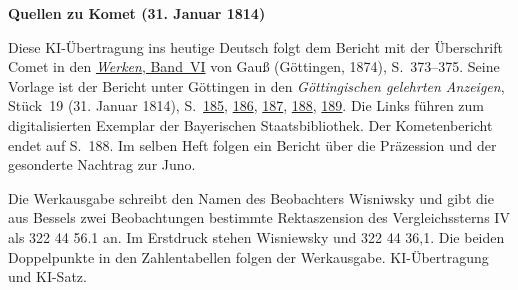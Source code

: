 \clearpage\thispagestyle{empty}
\begin{center}\textbf{Quellen zu Komet (31. Januar 1814)}\end{center}
\noindent Diese KI-Übertragung ins heutige Deutsch folgt dem Bericht mit der Überschrift Comet in den \href{https://gdz.sub.uni-goettingen.de/id/PPN236007467}{\textit{Werken}, Band~VI} von Gauß (Göttingen, 1874), S.~373--375. Seine Vorlage ist der Bericht unter Göttingen in den \textit{Göttingischen gelehrten Anzeigen}, Stück~19 (31. Januar 1814), S.~\href{https://api.digitale-sammlungen.de/iiif/image/v2/bsb10538685_00191/full/1600,/0/default.jpg}{185}, \href{https://api.digitale-sammlungen.de/iiif/image/v2/bsb10538685_00192/full/1600,/0/default.jpg}{186}, \href{https://api.digitale-sammlungen.de/iiif/image/v2/bsb10538685_00193/full/1600,/0/default.jpg}{187}, \href{https://api.digitale-sammlungen.de/iiif/image/v2/bsb10538685_00194/full/1600,/0/default.jpg}{188}, \href{https://api.digitale-sammlungen.de/iiif/image/v2/bsb10538685_00195/full/1600,/0/default.jpg}{189}. Die Links führen zum digitalisierten Exemplar der Bayerischen Staatsbibliothek. Der Kometenbericht endet auf S.~188. Im selben Heft folgen ein Bericht über die Präzession und der gesonderte Nachtrag zur Juno.
\par\smallskip\noindent Die Werkausgabe schreibt den Namen des Beobachters Wisniwsky und gibt die aus Bessels zwei Beobachtungen bestimmte Rektaszension des Vergleichssterns IV als 322 44 56.1 an. Im Erstdruck stehen Wisniewsky und 322 44 36,1. Die beiden Doppelpunkte in den Zahlentabellen folgen der Werkausgabe. KI-Übertragung und KI-Satz.
\clearpage
